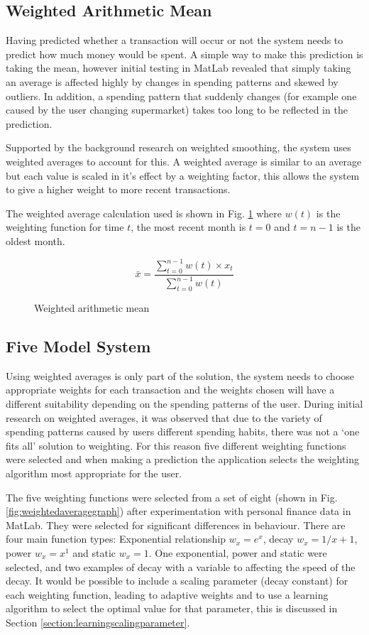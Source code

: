 \subsection{Weighted Arithmetic Mean}
Having predicted whether a transaction will occur or not the system needs to predict how much money would be spent. A simple way to make this prediction is taking the mean, however initial testing in MatLab revealed that simply taking an average is affected highly by changes in spending patterns and skewed by outliers. In addition, a spending pattern that suddenly changes (for example one caused by the user changing supermarket) takes too long to be reflected in the prediction.

Supported by the background research on weighted smoothing, the system uses weighted averages to account for this. A weighted average is similar to an average but each value is scaled in it's effect by a weighting factor, this allows the system to give a higher weight to more recent transactions.

The weighted average calculation used is shown in Fig. \ref{fig:weighting} where $w(t)$ is the weighting function for time $t$, the most recent month is $t = 0$ and $t = n - 1$ is the oldest month. 

\begin{figure}[h]
    \centering
    \[
        \bar{x} = 
        \frac{
                \sum\limits^{n-1}_{t=0}{w(t) \times x_t}
            }{
                \sum\limits_{t=0}^{n-1}{w(t)}
        } 
    \]
    \caption{Weighted arithmetic mean}
    \label{fig:weighting}
\end{figure}

\subsection{Five Model System}
Using weighted averages is only part of the solution, the system needs to choose appropriate weights for each transaction and the weights chosen will have a different suitability depending on the spending patterns of the user.
% 
During initial research on weighted averages, it was observed that due to the variety of spending patterns caused by users different spending habits, there was not a `one fits all' solution to weighting.
%
For this reason five different weighting functions were selected and when making a prediction the application selects the weighting algorithm most appropriate for the user.

The five weighting functions were selected from a set of eight (shown in Fig. \ref{fig:weightedaveragegraph}) after experimentation with personal finance data in MatLab. They were selected for significant differences in behaviour.
%
There are four main function types: Exponential relationship $w_x = e^{x}$, decay $w_x = {1}/{x + 1}$, power $w_x = x^1 $ and static $w_x = 1$. One exponential, power and static were selected, and two examples of decay with a variable to affecting the speed of the decay. It would be possible to include a scaling parameter (decay constant) for each weighting function, leading to adaptive weights and to use a learning algorithm to select the optimal value for that parameter, this is discussed in Section \ref{section:learningscalingparameter}.

